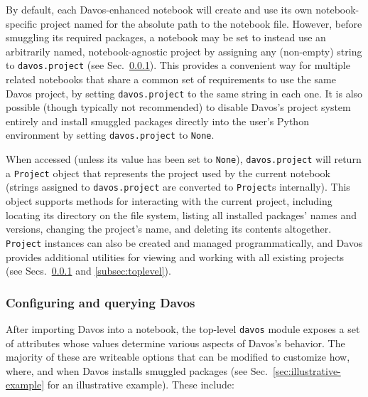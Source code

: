 \documentclass[preprint,12pt,a4paper]{elsarticle}
\begin{document}
By default, each Davos-enhanced notebook will create and use its own notebook-specific project named for the absolute path to the notebook file.
However, before smuggling its required packages, a notebook may be set to instead use an arbitrarily named, notebook-agnostic project by assigning any (non-empty) string to \texttt{davos.project} (see Sec.~\ref{subsec:config}).
This provides a convenient way for multiple related notebooks that share a common set of requirements to use the same Davos project, by setting \texttt{davos.project} to the same string in each one.
It is also possible (though typically not recommended) to disable Davos's project system entirely and install smuggled packages directly into the user's Python environment by setting \texttt{davos.project} to \texttt{None}.

When accessed (unless its value has been set to \texttt{None}), \texttt{davos.project} will return a \texttt{Project} object that represents the project used by the current notebook (strings assigned to \texttt{davos.project} are converted to \texttt{Project}s internally). This object supports methods for interacting with the current project, including locating its directory on the file system, listing all installed packages' names and versions, changing the project's name, and deleting its contents altogether.
\texttt{Project} instances can also be created and managed programmatically, and Davos provides additional utilities for viewing and working with all existing projects (see Secs.~\ref{subsec:config} and \ref{subsec:toplevel}).


\subsubsection{Configuring and querying Davos}\label{subsec:config}

After importing Davos into a notebook, the top-level \texttt{davos} module exposes a set of attributes whose values determine various aspects of Davos's behavior.
The majority of these are writeable options that can be modified to customize how, where, and when Davos installs smuggled packages (see Sec.~\ref{sec:illustrative-example} for an illustrative example).
These include:
\end{document}
